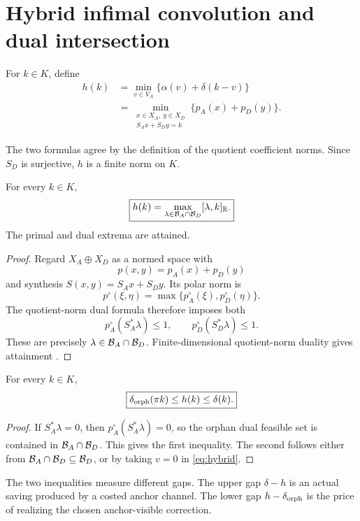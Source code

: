 \section{Hybrid infimal convolution and dual intersection}
\label{sec:hybrid}

\begin{definition}\label{def:hybrid}
For \(k\in K\), define
\begin{align}
 h(k)
 &=
 \min_{v\in V_A}
 \{\alpha(v)+\delta(k-v)\}
 \label{eq:hybrid}\\
 &=
 \min_{\substack{x\in X_A,\ y\in X_D\\
                  S_Ax+S_Dy=k}}
 \{p_A(x)+p_D(y)\}.
 \label{eq:hybrid-coeff}
\end{align}
\end{definition}

The two formulas agree by the definition of the quotient coefficient
norms.  Since \(S_D\) is surjective, \(h\) is a finite norm on \(K\).

\begin{theorem}\label{thm:hybrid-dual}
For every \(k\in K\),
\begin{equation}\label{eq:hybrid-dual}
 \boxed{\displaystyle
 h(k)
 =
 \max_{\lambda\in\mathcal B_A\cap\mathcal B_D}
 [\lambda,k]_{\mathbb R}.}
\end{equation}
The primal and dual extrema are attained.
\end{theorem}

\begin{proof}
Regard \(X_A\oplus X_D\) as a normed space with
\[
 p(x,y)=p_A(x)+p_D(y)
\]
and synthesis \(S(x,y)=S_Ax+S_Dy\).  Its polar norm is
\[
 p^\circ(\xi,\eta)=
 \max\{p_A^\circ(\xi),p_D^\circ(\eta)\}.
\]
The quotient-norm dual formula therefore imposes both
\[
 p_A^\circ(S_A^*\lambda)\le1,
 \qquad
 p_D^\circ(S_D^*\lambda)\le1.
\]
These are precisely \(\lambda\in\mathcal B_A\cap\mathcal B_D\).
Finite-dimensional quotient-norm duality gives attainment
\cite{Rockafellar1970,RockafellarWets1998}.
\end{proof}

\begin{corollary}\label{cor:hierarchy}
For every \(k\in K\),
\begin{equation}\label{eq:hierarchy}
 \boxed{\displaystyle
 \delta_{\rm orph}(\pi k)\le h(k)\le\delta(k).}
\end{equation}
\end{corollary}

\begin{proof}
If \(S_A^*\lambda=0\), then
\(p_A^\circ(S_A^*\lambda)=0\), so the orphan dual feasible set is
contained in \(\mathcal B_A\cap\mathcal B_D\).  This gives the first inequality.
The second follows either from
\(\mathcal B_A\cap\mathcal B_D\subseteq\mathcal B_D\), or by taking \(v=0\) in
\eqref{eq:hybrid}.
\end{proof}

The two inequalities measure different gaps.  The upper gap
\(\delta-h\) is an actual saving produced by a costed anchor channel.
The lower gap \(h-\delta_{\rm orph}\) is the price of realizing the
chosen anchor-visible correction.
